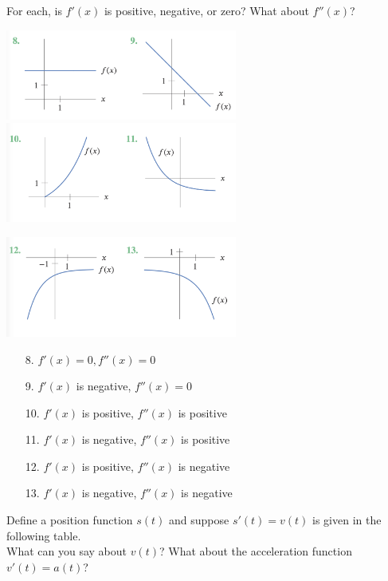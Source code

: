 \documentclass[11pt]{exam}
\begin{document}
\vspace{.5em}
\begin{questions}
  \question For each, is $f'(x)$ is positive, negative, or zero? What about $f''(x)$?

    \includegraphics[width=3in]{Figures/graphs1}
    \includegraphics[width=3in]{Figures/graphs2}

    \includegraphics[width=3in]{Figures/graphs3}
\begin{solution}
  \begin{enumerate}
  \item[8.]  \(f'(x) = 0, f''(x) = 0\)
  \item[9.] \(f'(x)\) is negative, \(f''(x) = 0\)
  \item[10.] \(f'(x)\) is positive, \(f''(x)\) is positive
  \item[11.] \(f'(x)\) is negative, \(f''(x)\) is positive
  \item[12.] \(f'(x)\) is positive, \(f''(x)\) is negative
  \item[13.] \(f'(x)\) is negative, \(f''(x)\) is negative
  \end{enumerate}
\end{solution}
\question Define a position function $s(t)$ and suppose $s'(t)=v(t)$ is given in the following table.\\
\hspace*{.4cm}  What can you say about $v(t)$?  What about the acceleration function $v'(t)=a(t)$?


\end{questions}
\end{document}
